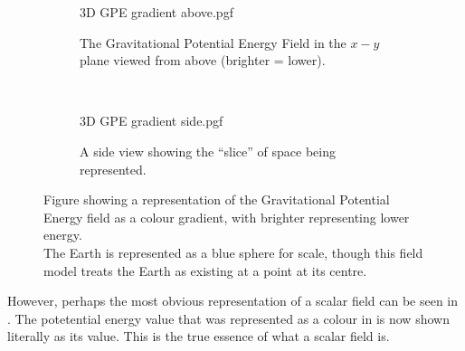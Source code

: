 \documentclass[main.tex]{subfiles}
\begin{document}
            \begin{figure}[!h]
                \centering
                \begin{subfigure}[h]{0.45\textwidth}
                    \centering
                    \scalebox{0.8}
                    {
                        \begin{adjustbox}{clip,trim=40mm 25mm 20mm 20mm}
                            {{3D GPE gradient above.pgf}}
                        \end{adjustbox}
                    }
                    \caption{The Gravitational Potential Energy Field in the $x-y$ plane viewed from above (brighter = lower).}
                    \label{subfig: 3D GPE Above}
                \end{subfigure}
                \hfill
                ~
                \begin{subfigure}[h]{0.45\textwidth}
                    \centering
                    \scalebox{0.8}
                    {
                        \begin{adjustbox}{clip,trim=35mm 25mm 20mm 20mm}
                            {{3D GPE gradient side.pgf}}
                        \end{adjustbox}
                    }
                    \caption{A side view showing the ``slice'' of space being represented.\vspace{1em}}
                    \label{subfig: 3D Gradient GPE Side}
                \end{subfigure}

                \vspace{2mm}

                \caption{Figure showing a representation of the Gravitational Potential Energy field as a colour gradient, with brighter representing lower energy.\\The Earth is represented as a blue sphere for scale, though this field model treats the Earth as existing at a point at its centre.
                }

                \label{fig: 3D Gradient GPE}
            \end{figure}
            \FloatBarrier


            \newpage
            However, perhaps the most obvious representation of a scalar field can be seen in . The potetential energy value that was represented as a colour in  is now shown literally as its value. This is the true essence of what a scalar field is.
\end{document}
